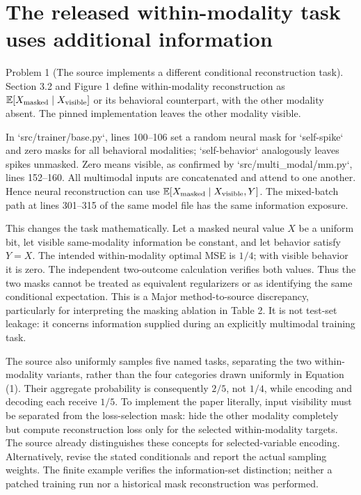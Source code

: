 \documentclass[10pt]{article}
\begin{document}
\section*{The released within-modality task uses additional information}
Problem 1 (The source implements a different conditional reconstruction task).  Section 3.2 and Figure 1 define within-modality reconstruction as \(\mathbb E[X_{\rm masked}\mid X_{\rm visible}]\) or its behavioral counterpart, with the other modality absent. The pinned implementation leaves the other modality visible.\par
In `src/trainer/base.py`, lines 100–106 set a random neural mask for `self-spike` and zero masks for all behavioral modalities; `self-behavior` analogously leaves spikes unmasked. Zero means visible, as confirmed by `src/multi\_modal/mm.py`, lines 152–160. All multimodal inputs are concatenated and attend to one another. Hence neural reconstruction can use \(\mathbb E[X_{\rm masked}\mid X_{\rm visible},Y]\). The mixed-batch path at lines 301–315 of the same model file has the same information exposure.\par
This changes the task mathematically. Let a masked neural value \(X\) be a uniform bit, let visible same-modality information be constant, and let behavior satisfy \(Y=X\). The intended within-modality optimal MSE is \(1/4\); with visible behavior it is zero. The independent two-outcome calculation verifies both values. Thus the two masks cannot be treated as equivalent regularizers or as identifying the same conditional expectation. This is a Major method-to-source discrepancy, particularly for interpreting the masking ablation in Table 2. It is not test-set leakage: it concerns information supplied during an explicitly multimodal training task.\par
The source also uniformly samples five named tasks, separating the two within-modality variants, rather than the four categories drawn uniformly in Equation (1). Their aggregate probability is consequently \(2/5\), not \(1/4\), while encoding and decoding each receive \(1/5\). To implement the paper literally, input visibility must be separated from the loss-selection mask: hide the other modality completely but compute reconstruction loss only for the selected within-modality targets. The source already distinguishes these concepts for selected-variable encoding. Alternatively, revise the stated conditionals and report the actual sampling weights. The finite example verifies the information-set distinction; neither a patched training run nor a historical mask reconstruction was performed.\par
\end{document}
